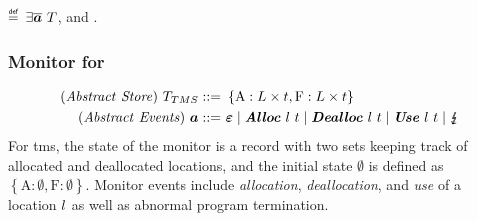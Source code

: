 \documentclass[dvipsnames]{llncs}
\begin{document}
\begin{definition}\label{def:monsat}
  \bul{$\monsafe{\trace}{\pi}$} $\isdef$ $\exists \bm{\overline{a}}\ T$, \iul{$\traceagree{\pi}{\trace}{\abstrace}$} and \oul{$\monitorcheck{\emptyset}{\monitor}{\abstrace}$}.
\end{definition}

\subsubsection{Monitor for }\label{subsubsec:tms}
\begin{gather*}
  \begin{aligned}
    \mi{(Abstract\ Store)}~\tmsmonitor\bnfdef&\ \left\{\text{A}:L\times\sandboxtag,\text{F}:L\times\sandboxtag\right\} 
    \\%
    \mi{(Abstract\ Events)}~\absevent\bnfdef&\ \absev{\emptyevent} \mid \absev{Alloc\ }\loc\ \sandboxtag \mid \absev{Dealloc\ }\loc\ \sandboxtag 
                                            \mid \absev{Use\ }\loc\ \sandboxtag \mid \absterm\\
  \end{aligned}
\end{gather*}
For \gls*{tms}, the state of the monitor is a record with two sets keeping track of allocated and deallocated locations, and the initial state $\emptyset$ is defined as $\left\{\text{A}:\emptyset,\text{F}:\emptyset\right\}$.
% 
Monitor events include {\em allocation}, {\em deallocation}, and {\em use} of a location $l$ as well as abnormal program termination.
\end{document}
